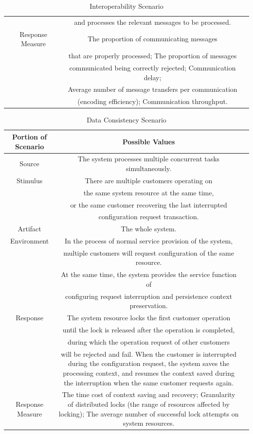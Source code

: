 \documentclass{article}
\begin{document}
\begin{center}
\begin{table}[!htb]
\begin{tabular}{ccc}
		& and processes the relevant messages to be processed.\\
		Response Measure & The proportion of communicating messages \\
		& that are properly processed; The proportion of messages \\
		& communicated being correctly rejected; Communication delay; \\
		& Average number of message transfers per communication \\
		& (encoding efficiency); Communication throughput.\\
		\bottomrule
		\end{tabular}
		\caption{Interoperability Scenario}
		\end{table}
	\end{center}

	\begin{center}
		\begin{table}[!htb]
		\begin{tabular}{ccc}
		\toprule  
		Portion of Scenario & Possible Values\\
		\midrule 
		Source & The system processes multiple concurrent tasks simultaneously.\\
		Stimulus & There are multiple customers operating on \\
		& the same system resource at the same time, \\
		& or the same customer recovering the last interrupted \\
		& configuration request transaction.\\
		Artifact & The whole system. \\
		Environment & In the process of normal service provision of the system, \\
		& multiple customers will request configuration of the same resource. \\
		& At the same time, the system provides the service function of \\
		& configuring request interruption and persistence context preservation.\\
		Response & The system resource locks the first customer operation \\
		& until the lock is released after the operation is completed, \\
		& during which the operation request of other customers \\
		& will be rejected and fail. When the customer is interrupted during the configuration request, the system saves the processing context, and resumes the context saved during the interruption when the same customer requests again.\\
		Response Measure & The time cost of context saving and recovery; Granularity of distributed locks (the range of resources affected by locking); The average number of successful lock attempts on system resources.\\
		\bottomrule
		\end{tabular}
		\caption{Data Consistency Scenario}
		\end{table}
	\end{center}
\end{document}
